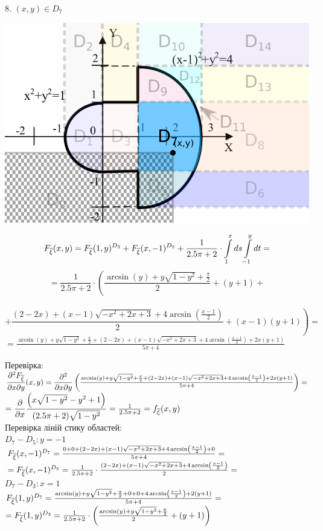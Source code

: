 \documentclass[14pt,a4paper]{scrartcl}
\theoremstyle{definition}
\theoremstyle{remark}
\theoremstyle{definition}
\theoremstyle{definition}
\begin{document}
\newpage

8. $(x,y) \in D_7$
\begin{center} \includegraphics[scale=0.3]{assets/zone885.png} \end{center}
$$
F_{\overline{\xi}} (x,y) =  F_{\overline{\xi}} (1, y)^{D_3} + F_{\overline{\xi}} (x, -1)^{D_5} +\frac{1}{2.5\pi + 2} \cdot  \int\limits_{1}^{ x}{ds  \int\limits_{-1}^{ y}{ dt}} =
$$
$$
= \frac{1}{2.5\pi + 2} \cdot \left( \dfrac{\arcsin\left(y\right)+y\sqrt{1-y^2} + \frac{\pi}{2} }{2}+ (y+1) \right.+$$\\$$+\left. \dfrac{\left(2-2x\right)+\left(x-1\right)\sqrt{-x^2+2x+3}+4\arcsin\left(\frac{x-1}{2}\right)}{2} + (x-1)(y+1)\right)=
$$
$
=\frac{\arcsin\left(y\right)+y\sqrt{1-y^2} + \frac{\pi}{2} + \left(2-2x\right)+\left(x-1\right)\sqrt{-x^2+2x+3}+4\arcsin\left(\frac{x-1}{2}\right)+ 2x(y+1)}{5\pi + 4}
$

Перевірка:\\
$\dfrac{\partial^2 F_{\overline{\xi}}}{\partial x \partial y}(x,y) =
\dfrac{\partial^2}{\partial x \partial y} \left(  \frac{\arcsin\left(y\right)+y\sqrt{1-y^2} + \frac{\pi}{2} + \left(2-2x\right)+\left(x-1\right)\sqrt{-x^2+2x+3}+4\arcsin\left(\frac{x-1}{2}\right)+ 2x(y+1)}{5\pi + 4}
\right) =$\\
$= \dfrac{\partial}{ \partial x} {\dfrac{\left(x\sqrt{1-y^2}-y^2+1\right)}{(2.5\pi + 2)\sqrt{1-y^2}}} = \frac{1}{2.5\pi + 2}=f_{\overline{\xi}} (x,y)$\\

Перевірка ліній стику областей:\\
$D_7 - D_5: y = -1$\\
$ F_{\overline{\xi}} (x,-1)^{D_7} =  \frac{0+0 + \left(2-2x\right)+\left(x-1\right)\sqrt{-x^2+2x+3}+4\arcsin\left(\frac{x-1}{2}\right)+0}{5\pi + 4} =$\\$= F_{\overline{\xi}} (x,-1)^{D_5}= \frac{1}{2.5\pi + 2} \cdot \frac{\left(2-2x\right)+\left(x-1\right)\sqrt{-x^2+2x+3}+4\arcsin\left(\frac{x-1}{2}\right)}{2} = $\\
$D_7 - D_3 : x = 1$\\
$ F_{\overline{\xi}} (1,y)^{D_7} = \frac{\arcsin\left(y\right)+y\sqrt{1-y^2} + \frac{\pi}{2} + 0+0+4\arcsin\left(\frac{x-1}{2}\right)+ 2(y+1)}{5\pi + 4} =$\\
$= F_{\overline{\xi}} (1,y)^{D_3} = \frac{1}{2.5\pi + 2} \cdot \left( \frac{\arcsin\left(y\right)+y\sqrt{1-y^2} + \frac{\pi}{2} }{2}+ (y+1)\right)$
\newpage
\end{document}
